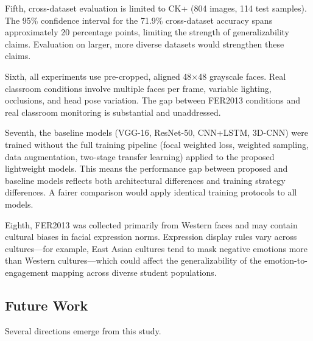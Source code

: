 \documentclass[apajournal,article,submit,pdftex,moreauthors]{Definitions/mdpi}
\begin{document}
Fifth, cross-dataset evaluation is limited to CK+ (804 images, 114 test samples). The 95\% confidence interval for the 71.9\% cross-dataset accuracy spans approximately 20 percentage points, limiting the strength of generalizability claims. Evaluation on larger, more diverse datasets would strengthen these claims.

Sixth, all experiments use pre-cropped, aligned 48$\times$48 grayscale faces. Real classroom conditions involve multiple faces per frame, variable lighting, occlusions, and head pose variation. The gap between FER2013 conditions and real classroom monitoring is substantial and unaddressed.

Seventh, the baseline models (VGG-16, ResNet-50, CNN+LSTM, 3D-CNN) were trained without the full training pipeline (focal weighted loss, weighted sampling, data augmentation, two-stage transfer learning) applied to the proposed lightweight models. This means the performance gap between proposed and baseline models reflects both architectural differences and training strategy differences. A fairer comparison would apply identical training protocols to all models.

Eighth, FER2013 was collected primarily from Western faces and may contain cultural biases in facial expression norms. Expression display rules vary across cultures---for example, East Asian cultures tend to mask negative emotions more than Western cultures---which could affect the generalizability of the emotion-to-engagement mapping across diverse student populations.

\subsection{Future Work}

Several directions emerge from this study.
\end{document}

